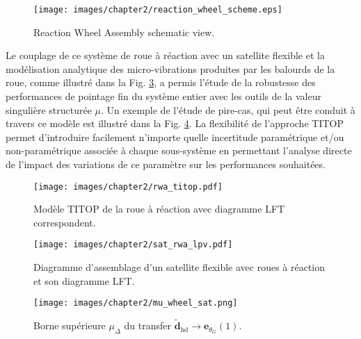 \begin{figure}[!ht]
\centering
\texttt{[image: images/chapter2/reaction\_wheel\_scheme.eps]} %
\caption{Reaction Wheel Assembly schematic view.} 
\label{fig:reaction_wheel_scheme_fr}
\end{figure}

Le couplage de ce système de roue à réaction avec un satellite flexible et la modélisation analytique des micro-vibrations produites par les balourds de la roue, comme illustré dans la Fig. \ref{fig:sat_rwa_lpv_fr}, a permis l’étude de la robustesse des performances de pointage fin du système entier avec les outils de la valeur singulière structurée $\mu$. Un exemple de l’étude de pire-cas, qui peut être conduit à travers ce modèle est illustré dans la Fig. \ref{fig:mu_wheel_sat_fr}. La flexibilité de l’approche TITOP permet d’introduire facilement n’importe quelle incertitude paramétrique et/ou non-paramétrique associée à chaque sous-système en permettant l’analyse directe de l’impact des variations de ce paramètre sur les performances souhaitées.    

\begin{figure}[!ht]
\centering
\texttt{[image: images/chapter2/rwa\_titop.pdf]} %
\caption{Modèle TITOP de la roue à réaction avec diagramme LFT correspondent.} 
\label{fig:rwa_titop_fr}
\end{figure}

\begin{figure}[!h]
\centering
\texttt{[image: images/chapter2/sat\_rwa\_lpv.pdf]} %
\caption{Diagramme d'assemblage d'un satellite flexible avec roues à réaction et son diagramme LFT.} 
\label{fig:sat_rwa_lpv_fr}
\end{figure}

\begin{figure}[!h]
\centering
\texttt{[image: images/chapter2/mu\_wheel\_sat.png]} %
\caption{Borne supérieure $\mu_{\Delta}$ du transfer $\tilde{\mathbf{d}}_{\mathrm{hd}}\rightarrow\mathbf{e}_{\theta_{G}}(1)$.} 
\label{fig:mu_wheel_sat_fr}
\end{figure}


